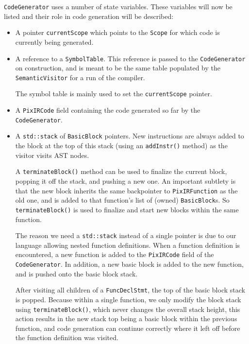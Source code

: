 \documentclass[11pt,a4paper]{scrartcl}
\begin{document}
\verb|CodeGenerator| uses a number of state variables. These variables will now be listed and their role in code generation will be described:
\begin{itemize}
  \item A pointer \verb|currentScope| which points to the \verb|Scope| for which code is currently being generated.

  \item A reference to a \verb|SymbolTable|. This reference is passed to the \verb|CodeGenerator| on construction, and is meant to be the same table populated by the \verb|SemanticVisitor| for a run of the compiler.

        The symbol table is mainly used to set the \verb|currentScope| pointer.

  \item A \verb|PixIRCode| field containing the code generated so far by the \verb|CodeGenerator|.

  \item A \verb|std::stack| of \verb|BasicBlock| pointers. New instructions are always added to the block at the top of this stack (using an \verb|addInstr()| method) as the visitor visits AST nodes.

        A \verb|terminateBlock()| method can be used to finalize the current block, popping it off the stack, and pushing a new one. An important subtlety is that the new block inherits the same backpointer to \verb|PixIRFunction| as the old one, and is added to that function's list of (owned) \verb|BasicBlock|s. So \verb|terminateBlock()| is used to finalize and start new blocks within the same function.

        The reason we need a \verb|std::stack| instead of a single pointer is due to our language allowing nested function definitions. When a function definition is encountered, a new function is added to the \verb|PixIRCode| field of the \verb|CodeGenerator|. In addition, a new basic block is added to the new function, and is pushed onto the basic block stack.

        After visiting all children of a \verb|FuncDeclStmt|, the top of the basic block stack is popped. Because within a single function, we only modify the block stack using \verb|terminateBlock()|, which never changes the overall stack height, this action results in the new stack top being a basic block within the previous function, and code generation can continue correctly where it left off before the function definition was visited.


\end{itemize}
\end{document}
